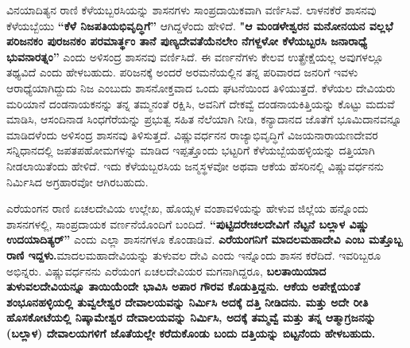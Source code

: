 \vskip 2pt

ವಿನಯಾದಿತ್ಯನ ರಾಣಿ ಕೆಳೆಯಬ್ಬರಸಿಯನ್ನು ಶಾಸನಗಳು ಸಾಂಪ್ರದಾಯಿಕವಾಗಿ ವರ್ಣಿಸಿವೆ. ಲಾಳನಕೆರೆ ಶಾಸನವು ಕೆಳೆಯಬ್ಬೆಯು \textbf{“ಕೆಳೆ ನಿಜಪತಿಯಭಿವೃದ್ಧಿಗೆ”} ಆಗಿದ್ದಳೆಂದು ಹೇಳಿದೆ. \textbf{"ಆ ಮಂಡಳೇಶ್ವರನ ಮನೋನಯನ ವಲ್ಲಭೆ ಪರಿಜನಕಂ ಪುರಜನಕಂ ಪರಮಾರ್ತ್ಥಂ ತಾನೆ ಪುಣ್ಯದೇವತೆಯೆನಲೇಂ ನೆಗಳ್ದಳೋ ಕೆಳೆಯಬ್ಬರಸಿ ಜನಾರಾಧ್ಯೆ ಭುವನಾರತ್ನಂ”} ಎಂದು ಅಳಿಸಂದ್ರ ಶಾಸನವು ವರ್ಣಿಸಿದೆ. ಈ ವರ್ಣನೆಗಳು ಕೇಲವ ಉತ್ಪ್ರೇಕ್ಷೆಯಲ್ಲ ಅವುಗಳಲ್ಲೂ ತಥ್ಯವಿದೆ ಎಂದು ಹೇಳಬಹುದು. ಪರಿಜನಕ್ಕೆ ಅಂದರೆ ಅರಮನೆಯಲ್ಲಿನ ತನ್ನ ಪರಿವಾರದ ಜನರಿಗೆ ಇವಳು ಆರಾಧ್ಯೆಯಾಗಿದ್ದುದು ನಿಜ ಎಂಬುದು ಶಾಸನೋಕ್ತವಾದ ಒಂದು ಘಟನೆಯಿಂದ ತಿಳಿಯುತ್ತದೆ. ಕೆಳೆಯಲ ದೇವಿಯರು ಮರಿಯಾನೆ ದಂಡನಾಯಕನನ್ನು ತನ್ನ ತಮ್ಮನಂತೆ ರಕ್ಷಿಸಿ, ಅವನಿಗೆ ದೇಕವ್ವೆ ದಂಡನಾಯಕಿತ್ತಿಯನ್ನು ಕೊಟ್ಟು ಮದುವೆ ಮಾಡಿಸಿ, ಆಸಂದಿನಾಡ ಸಿಂಧಗೆರೆಯನ್ನು ಪ್ರಭುತ್ವ ಸಹಿತ ನೆಲೆಯಾಗಿ ನೀಡಿ, ಕನ್ಯಾದಾನದ ಜೊತೆಗೆ ಭೂಮಿದಾನವನ್ನೂ ಮಾಡಿದಳೆಂದು ಅಳಿಸಂದ್ರ ಶಾಸನವು ತಿಳಿಸುತ್ತದೆ. ವಿಷ್ಣುವರ್ಧನನ ರಾಜ್ಯಾಭಿವೃದ್ಧಿಗೆ ವಿಜಯನಾರಾಯಣದೇವರ ಸನ್ನಿಧಾನದಲ್ಲಿ ಜಪತಪಹೋಮಗಳನ್ನು ಮಾಡಿದ ಇಪ್ಪತ್ತೊಂದು ಭಟ್ಟರಿಗೆ ಕೆಳೆಯಬ್ಬೆಯಹಳ್ಳಿಯನ್ನು ದತ್ತಿಯಾಗಿ ನೀಡಲಾಯಿತೆಂದು ಹೇಳಿದೆ. ಇದು ಕೆಳೆಯಬ್ಬರಸಿಯ ಜನ್ಮಸ್ಥಳವೋ ಅಥವಾ ಆಕೆಯ ಹೆಸರಿನಲ್ಲಿ ವಿಷ್ಣುವರ್ಧನನು ನಿರ್ಮಿಸಿದ ಅಗ್ರಹಾರವೋ ಆಗಿರಬಹುದು.

\vskip 2pt

ಎರೆಯಂಗನ ರಾಣಿ ಏಚಲದೇವಿಯ ಉಲ್ಲೇಖ, ಹೊಯ್ಸಳ ವಂಶಾವಳಿಯನ್ನು ಹೇಳುವ ಜಿಲ್ಲೆಯ ಹನ್ನೊಂದು ಶಾಸನಗಳಲ್ಲಿ, ಸಾಂಪ್ರದಾಯಕ ವರ್ಣನೆಯೊಂದಿಗೆ ಬಂದಿದೆ. \textbf{“ಪುಟ್ಟಿದರೇಚಲದೇವಿಗೆ ನೆಟ್ಟನೆ ಬಲ್ಲಾಳ ವಿಷ್ಣು ಉದಯಾದಿತ್ಯರ್​”} ಎಂದು ಎಲ್ಲಾ ಶಾಸನಗಳೂ ಕೊಂಡಾಡಿವೆ. \textbf{ಎರೆಯಂಗನಿಗೆ ಮಾದಲಮಹಾದೇವಿ ಎಂಬ ಮತ್ತೊಬ್ಬ ರಾಣಿ ಇದ್ದಳು.}\break ಮಾದಲಮಹಾದೇವಿಯನ್ನು ತುಳುವಲ ದೇವಿ ಎಂದು ಇನ್ನೊಂದು ಶಾಸನ ಕರೆದಿದೆ. ಇವರಿಬ್ಬರೂ ಅಭಿನ್ನರು. ವಿಷ್ಣುವರ್ಧನನು ಎರೆಯಂಗ ಏಚಲದೇವಿಯರ ಮಗನಾಗಿದ್ದರೂ, \textbf{ಬಲತಾಯಿಯಾದ ತುಳುವಲದೇವಿಯನ್ನೂ ತಾಯಿಯೆಂದೇ ಭಾವಿಸಿ ಅಪಾರ ಗೌರವ ಕೊಡುತ್ತಿದ್ದನು. ಆಕೆಯ ಅಪೇಕ್ಷೆಯಂತೆ ಶಂಭೂನಹಳ್ಳಿಯಲ್ಲಿ ತುವ್ವಲೇಶ್ವರ ದೇವಾಲಯವನ್ನು ನಿರ್ಮಿಸಿ ಅದಕ್ಕೆ ದತ್ತಿ ನೀಡಿದನು. ಮತ್ತು ಅದೇ ರೀತಿ ಹೊಸಕೋಟೆಯಲ್ಲಿ ನಿಷ್ಕಾಮೇಶ್ವರ ದೇವಾಲಯವನ್ನು ನಿರ್ಮಿಸಿ, ಅದಕ್ಕೆ ತಮ್ಮವ್ವೆ ಮತ್ತು ತನ್ನ ಆತ್ಮಾಗ್ರಜನನ್ನು (ಬಲ್ಲಾಳ) ದೇವಾಲಯಗಳಿಗೆ ಜೊತೆಯಲ್ಲೇ ಕರೆದುಕೊಂಡು ಬಂದು ದತ್ತಿಯನ್ನು ಬಿಟ್ಟನೆಂದು ಹೇಳಬಹುದು.}

